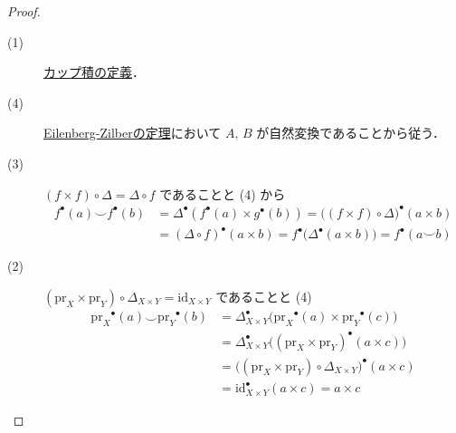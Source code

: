 \documentclass[algtopo_main]{subfiles}
\begin{document}
\begin{proof}
    \begin{description}
        \item[(1)] \hyperref[def:cup]{カップ積の定義}．
        \item[(4)] \hyperref[thm:EZ]{Eilenberg-Zilberの定理}において $A,\, B$ が自然変換であることから従う．
        \item[(3)] $(f \times f) \circ \Delta = \Delta \circ f$ であることと (4) から
        \begin{align}
            f^\bullet (a) \smile f^\bullet (b) &= \Delta^\bullet (f^\bullet (a) \times g^\bullet (b)) = \bigl( (f \times f) \circ \Delta \bigr)^\bullet (a \times b) \\
            &= (\Delta \circ f)^\bullet (a \times b) = f^\bullet \bigl( \Delta^\bullet (a \times b) \bigr) = f^\bullet (a \smile b)
        \end{align}
        \item[(2)] $(\mathrm{pr}_X \times \mathrm{pr}_Y) \circ \Delta_{X\times Y} = \mathrm{id}_{X\times Y}$ であることと (4) 
        \begin{align}
            \mathrm{pr}_X{}^\bullet (a) \smile \mathrm{pr}_Y{}^\bullet (b) &= \Delta^\bullet_{X \times Y} \bigl( \mathrm{pr}_X{}^\bullet (a) \times \mathrm{pr}_Y{}^\bullet (c) \bigr) \\
            &= \Delta_{X\times Y}^\bullet \bigl( (\mathrm{pr}_X \times \mathrm{pr}_Y)^\bullet (a \times c) \bigr) \\
            &= \bigl( (\mathrm{pr}_X \times \mathrm{pr}_Y) \circ \Delta_{X\times Y} \bigr)^\bullet (a \times c) \\
            &= \mathrm{id}_{X\times Y}^\bullet (a \times c) = a\times c
        \end{align}
    \end{description}
    
\end{proof}
\end{document}
